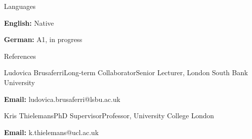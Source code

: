 \documentclass{cv}
\begin{document}
\begin{spacing}{1.1}
        \begin{rSection}{Languages}
            \item \begin{itemize*}[itemjoin={\hspace{1cm}|\hspace{1cm}}]
                \item \textbf{English:} Native
                \item \textbf{German:} A1, in progress
            \end{itemize*} 
        \end{rSection}
    
        \begin{rSection}{References}
            \item \noindent \begin{minipage}[t]{0.5\textwidth}
                \begin{rSubsection}{Ludovica Brusaferri}{Long-term Collaborator}{Senior Lecturer, London South Bank University}{}
                    \item \textbf{Email:} ludovica.brusaferri@lsbu.ac.uk
                \end{rSubsection}
            \end{minipage}
            \hfill
            \begin{minipage}[t]{0.45\textwidth}
                \begin{rSubsection}{Kris Thielemans}{PhD Supervisor}{Professor, University College London}{}
                    \item \textbf{Email:} k.thielemans@ucl.ac.uk
                \end{rSubsection}
            \end{minipage}
        \end{rSection}
    \end{spacing}

    \newpage
\end{document}
